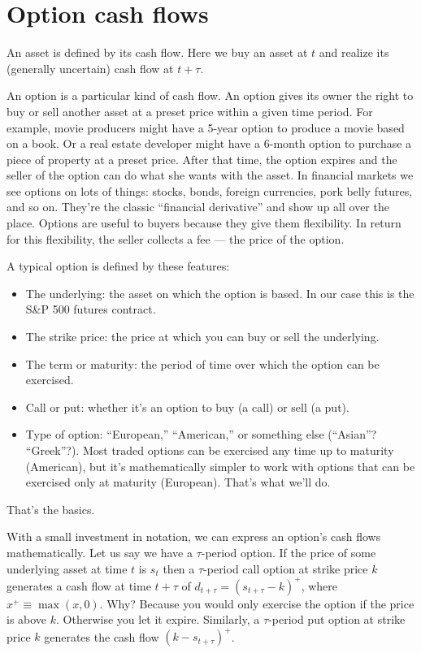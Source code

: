\documentclass[11pt]{article}
\begin{document}
\section{Option cash flows}

An asset is defined by its cash flow.
Here we buy an asset at $t$ and realize its (generally uncertain) cash flow at $t+\tau$.

An option is a particular kind of cash flow.
An option gives its owner the right to buy or sell another asset at a preset price
within a given time period.
For example, movie producers might have a 5-year option to produce a
movie based on a book.
Or a real estate developer might have a 6-month option to purchase
a piece of property at a preset price.
After that time, the option expires and
the seller of the option can do what she wants with the asset.
In financial markets we see options on lots of things:  stocks, bonds,
foreign currencies, pork belly futures, and so on.
They're the classic ``financial derivative'' and show up all over the place.
Options are useful to buyers because they give them flexibility.
In return for this flexibility, the seller collects a fee --- the price
of the option.

A typical option is defined by these features:
\begin{itemize}
\item The underlying:  the asset on which the option is based.
In our case this is the S\&P 500 futures contract.
\item The strike price: the price at which you can buy or sell
the underlying.
\item The term or maturity: the period of time
over which the option can be exercised.
\item Call or put:  whether it's an option to buy (a call) or sell (a put).
\item Type of option:  ``European,'' ``American,'' or something else (``Asian''?  ``Greek''?).
Most traded options can be exercised any time up to maturity (American),
but it's mathematically simpler to work with options that can be
exercised only at maturity (European).
That's what we'll do.
\end{itemize}
That's the basics.

With a small investment in notation,
we can express an option's cash flows mathematically.
Let us say we have a $\tau$-period option.
If the price of some underlying asset at time $t$ is $s_t$
then a $\tau$-period call option at strike price $k$
generates a cash flow at time $t+\tau$ of
$ d_{t + \tau} = ( s_{t+\tau} - k )^+ $,
where $x^+ \equiv \max(x,0) $.
Why?  Because you would only exercise the option if the price is above $k$.
Otherwise you let it expire.
Similarly, a $\tau$-period put option at strike price $k$
generates the cash flow $ (k - s_{t+\tau} )^+ $.
\end{document}

